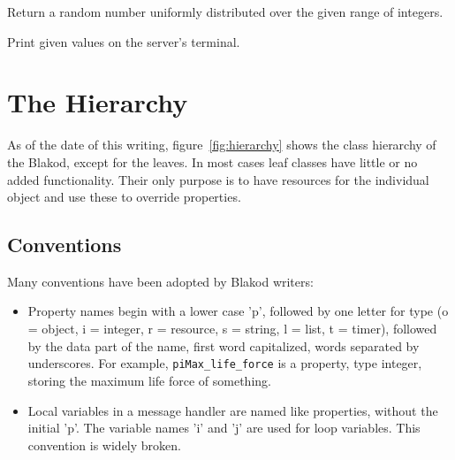 \documentclass[12pt]{article}
\newcommand{\prop}[1]{\texttt{#1}}
\newenvironment{leftlines}
{\setlength{\oldindent}{\parindent}
 \setlength{\parindent}{0in}\vspace{\baselineskip}}
{\setlength{\parindent}{\oldindent}\vspace{\baselineskip}}
\begin{document}
\begin{leftlines}
\end{leftlines}

Return a random number uniformly distributed over the given range of integers.

\begin{leftlines}
\end{leftlines}

Print given values on the server's terminal.

\section{The Hierarchy}

As of the date of this writing, figure~\ref{fig:hierarchy} shows the
class hierarchy of the Blakod, except for the leaves.  In most
cases leaf classes have little or no added functionality.  Their only
purpose is to have resources for the individual object and use these
to override properties.

\subsection{Conventions}

Many conventions have been adopted by Blakod writers:

\begin{itemize}
\item Property names begin with a lower case 'p', followed by one
letter for type (o = object, i = integer, r = resource, s = string, l
= list, t = timer), followed by the data part of the name, first word
capitalized, words separated by underscores.  For example,
\prop{piMax\_life\_force} is a property, type integer, storing the
maximum life force of something.
\item Local variables in a message handler are named like properties,
without the initial 'p'.  The variable names 'i' and 'j' are used for
loop variables.  This convention is widely broken.
\end{itemize}
\end{document}
